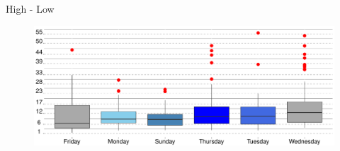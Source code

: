 \documentclass[final, xcolor=table]{beamer}\usepackage[]{graphicx}\usepackage[]{color}
\begin{document}
\begin{columns}[t]
\begin{column}{.49 \linewidth}
\begin{block}{High - Low}
   \begin{figure}[H]
    \includegraphics[scale=1]{figure/BP_Plot-2.pdf}
    \end{figure}

  \end{block}
  
\end{column}

\end{columns}

\end{document}
